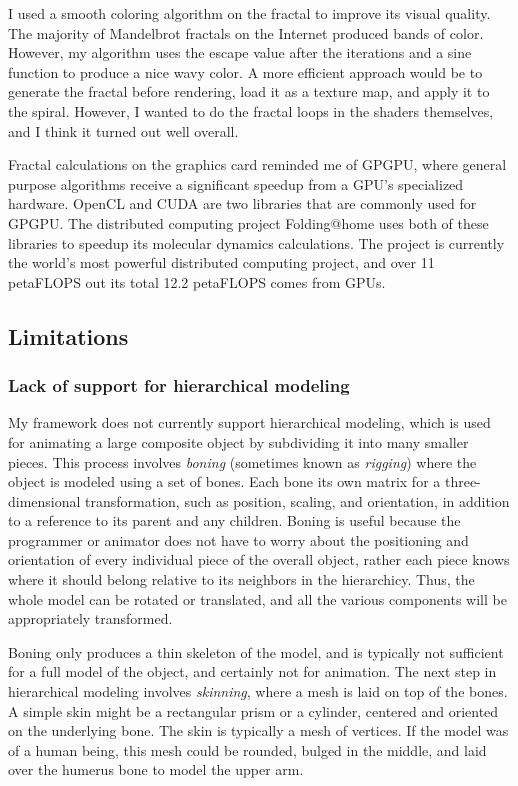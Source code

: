 \documentclass[journal]{IEEEtran}
\begin{document}
I used a smooth coloring algorithm on the fractal to improve its visual quality. The majority of Mandelbrot fractals on the Internet produced bands of color. However, my algorithm uses the escape value after the iterations and a sine function to produce a nice wavy color. A more efficient approach would be to generate the fractal before rendering, load it as a texture map, and apply it to the spiral. However, I wanted to do the fractal loops in the shaders themselves, and I think it turned out well overall.

Fractal calculations on the graphics card reminded me of GPGPU, where general purpose algorithms receive a significant speedup from a GPU's specialized hardware. OpenCL and CUDA are two libraries that are commonly used for GPGPU. The distributed computing project Folding@home uses both of these libraries to speedup its molecular dynamics calculations. The project is currently the world's most powerful distributed computing project, and over 11 petaFLOPS out its total 12.2 petaFLOPS comes from GPUs.

\subsection{Limitations}

\subsubsection{Lack of support for hierarchical modeling}

My framework does not currently support hierarchical modeling, which is used for animating a large composite object by subdividing it into many smaller pieces. This process involves \textit{boning} (sometimes known as \textit{rigging}) where the object is modeled using a set of bones. Each bone its own matrix for a three-dimensional transformation, such as position, scaling, and orientation, in addition to a reference to its parent and any children. Boning is useful because the programmer or animator does not have to worry about the positioning and orientation of every individual piece of the overall object, rather each piece knows where it should belong relative to its neighbors in the hierarchicy. Thus, the whole model can be rotated or translated, and all the various components will be appropriately transformed.

Boning only produces a thin skeleton of the model, and is typically not sufficient for a full model of the object, and certainly not for animation. The next step in hierarchical modeling involves \textit{skinning}, where a mesh is laid on top of the bones. A simple skin might be a rectangular prism or a cylinder, centered and oriented on the underlying bone. The skin is typically a mesh of vertices. If the model was of a human being, this mesh could be rounded, bulged in the middle, and laid over the humerus bone to model the upper arm.
\end{document}
